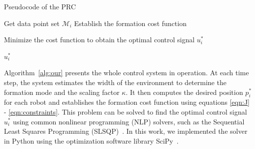 \begin{algorithm}[h!]
\caption{Pseudocode of the PRC}
\label{alg:our}
Get data point set $\mathcal{M}_i$\;
Establish the formation cost function

Minimize the cost function to obtain the optimal control signal $u_i^*$\;

\Return $u_i^*$\;
\end{algorithm}

Algorithm~\ref{alg:our} presents the whole control system in operation. At each time step, the system estimates the width of the environment to determine the formation mode and the scaling factor $\kappa$. It then computes the desired position $p_i^*$ for each robot and establishes the formation cost function using equations \eqref{eqn:J} - \eqref{eqn:constraints}. This problem can be solved to find the optimal control signal $u_i^*$ using common nonlinear programming (NLP)
solvers, such as the Sequential Least Squares Programming (SLSQP)~\cite{kraft1988software}. In this work, we implemented the solver in Python using the optimization software library SciPy~\cite{2020SciPy-NMeth}.
